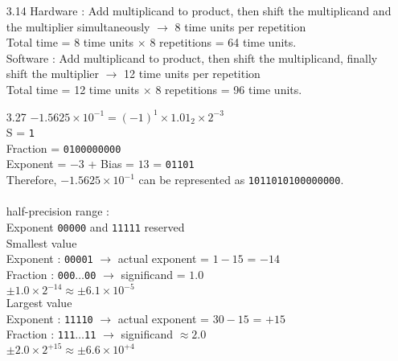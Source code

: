 \documentclass[12pt, a4paper]{article}
\begin{document}
\begin{itemize}[font=\bfseries]
\item[3.14]
Hardware : Add multiplicand to product, then shift the multiplicand and the multiplier simultaneously $\rightarrow$ 8 time units per repetition \\ Total time = 8 time units $\times$ 8 repetitions = 64 time units. \\
Software : Add multiplicand to product, then shift the multiplicand, finally shift the multiplier $\rightarrow$ 12 time units per repetition \\ Total time = 12 time units $\times$ 8 repetitions = 96 time units. \\

\item[3.27]
$-1.5625 \times 10^{-1} = (-1)^1 \times 1.01_2 \times 2^{-3}$ \\
S = \texttt{1} \\
Fraction = \texttt{0100000000} \\
Exponent = $-3$ + Bias = $13$ = \texttt{01101} \\
Therefore, $-1.5625 \times 10^{-1}$ can be represented as \texttt{1011010100000000}. \\
\vspace*{-0.3cm} \\
half-precision range : \\
Exponent \texttt{00000} and \texttt{11111} reserved \\
\newpage
Smallest value \\
\hspace*{0.5cm} Exponent : \texttt{00001} $\rightarrow$ actual exponent = $1 - 15$ = $-14$ \\
\hspace*{0.5cm} Fraction : \texttt{000$\ldots$00} $\rightarrow$ significand = $1.0$ \\
\hspace*{0.5cm} $\pm 1.0 \times 2^{-14} \approx \pm 6.1 \times 10^{-5}$ \\ 
Largest value \\
\hspace*{0.5cm} Exponent : \texttt{11110} $\rightarrow$ actual exponent = $30 - 15$ = $+15$ \\
\hspace*{0.5cm} Fraction : \texttt{111$\ldots$11} $\rightarrow$ significand $\approx 2.0$ \\
\hspace*{0.5cm} $\pm 2.0 \times 2^{+15} \approx \pm 6.6 \times 10^{+4}$ \\
\vspace*{-0.3cm} \\ 

\end{itemize}
\end{document}
